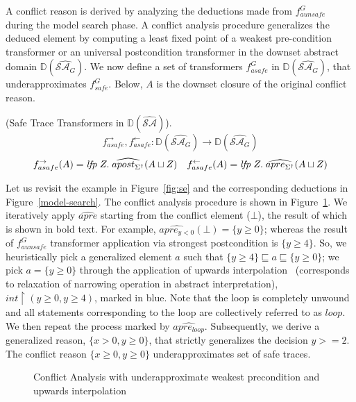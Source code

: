 A conflict reason is derived by analyzing the deductions made 
from $f_{aunsafe}^{G}$ during the model search phase.  
A conflict analysis procedure generalizes the deduced element by computing a
least fixed point of a weakest pre-condition transformer or an universal
postcondition transformer in the downset abstract domain
$\mathbb{D}(\widehat{\mathcal{SA}_{G}})$.  
%
We now define a set of transformers 
$f_{asafe}^G$ in $\mathbb{D}(\widehat{\mathcal{SA}_{G}})$, that underapproximates
$f_{safe}^{G}$.  Below, $A$ is the downset closure of the original conflict
reason. 
%
\begin{definition} (Safe Trace Transformers in
  $\mathbb{D}(\widehat{\mathcal{SA}})$). 
  \[
    f_{asafe}^{\rightarrow}, f_{asafe}^{\leftarrow} :
  \mathbb{D}(\widehat{\mathcal{SA}_{G}})
  \rightarrow \mathbb{D}(\widehat{\mathcal{SA}_{G}})
  \]
  \[
    f_{asafe}^{\rightarrow}(A) = \mathit{lfp}\; Z.\;
    \widehat{apost_{\Sigma^\dagger}}(A \sqcup Z)
    \quad
    f_{asafe}^{\leftarrow}(A) = \mathit{lfp}\; Z.\; 
    \widehat{apre_{\Sigma^\dagger}}(A \sqcup Z)
  \] 
\end{definition}
%
\begin{example}
  Let us revisit the example in Figure~\ref{fig:se} and the corresponding
  deductions in Figure~\ref{model-search}. The conflict analysis procedure is
  shown in Figure~\ref{conflict-example}.  We iteratively apply $\widehat{apre}$ 
  starting from the conflict element ($\bot$), the result of which is shown in
  bold text.  For example, $\widehat{apre_{y < 0}}(\bot)= \{y \geq 0\}$; whereas the
  result of $f_{aunsafe}^{G}$ transformer application via strongest postcondition 
  is $\{y\geq 4\}$.  So, we heuristically pick a generalized element $a$ such 
  that $\{y\geq 4\} \sqsubseteq a \sqsubseteq \{y \geq 0\}$; we pick $a=\{y \geq 0\}$ 
  through the application of upwards
  interpolation~\cite{leo-thesis} (corresponds to relaxation of narrowing
  operation in abstract interpretation), $int\upharpoonright(y \geq 0, y \geq 4)$, 
  marked in blue.  
  Note that the loop is completely unwound and all statements corresponding 
  to the loop are collectively referred to as $loop$.
  We then repeat the process marked by $\widehat{apre_{loop}}$. 
  Subsequently, we derive a generalized reason, $\{x>0, y \geq 0\}$, that strictly generalizes
  the decision $y>=2$. The conflict reason $\{x \geq 0,y \geq 0\}$ underapproximates 
  set of safe traces. \\
\end{example}
%
\begin{figure}[t]
\centering
\vspace*{-0.2cm}
  \caption{Conflict Analysis with underapproximate weakest precondition and
  upwards interpolation}
\label{conflict-example}
\end{figure}
%

